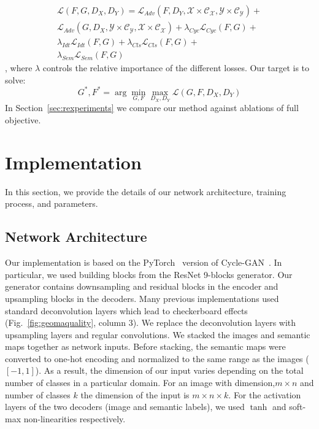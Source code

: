 \begin{equation}
\begin{aligned}
\mathcal{L}(F, G,D_X,D_Y) = \mathcal{L}_{Adv}(F, D_Y, \mathcal{ X \times C_X}, \mathcal{ Y \times C_Y}) + \\ \mathcal{L}_{Adv}(G, D_X, \mathcal{ Y \times C_Y}, \mathcal{ X \times C_X}) + \lambda_{Cyc}\mathcal{L}_{Cyc}(F, G) +\\ \lambda_{Idt}\mathcal{L}_{Idt}(F, G) + \lambda_{Cls}\mathcal{L}_{Cls}(F, G)+\\ \lambda_{Sem}\mathcal{L}_{Sem}(F, G)
\end{aligned}
\label{eq:fullobjective}
\end{equation}
, where $\lambda$ controls the relative importance of the different losses. Our target is to solve:
\begin{equation}
G^*, F^* = \arg \min_{G,F} \max_{D_X, D_Y}\mathcal{L}(G,F,D_X, D_Y)
\end{equation}
In Section~\ref{sec:rexperiments} we compare our method against ablations of full objective. 







\section{Implementation}\label{sec:implementation}
In this section, we provide the details of our network architecture, training process, and parameters.
\subsection{ Network Architecture}
Our implementation is based on the PyTorch~\cite{paszke_automatic_2017} version of Cycle-GAN~\cite{zhu_unpaired_2017}. In particular, we used building blocks from the  ResNet 9-blocks generator. Our generator contains downsampling and residual blocks in the encoder and upsampling blocks in the decoders. Many previous implementations used standard deconvolution layers which lead to checkerboard effects (Fig.~\ref{fig:geomaquality}, column 3). We replace the deconvolution layers with upsampling layers and regular convolutions. We stacked the images and semantic maps together as network inputs. Before stacking, the semantic maps were converted to one-hot encoding and normalized to the same range as the images ($[-1,1]$). As a result, the dimension of our input varies depending on the total number of classes in a particular domain. For an image with dimension,$m\times n$ and number of classes $k$ the dimension of the input is $m \times n \times k$. For the activation layers of the two decoders (image and semantic labels), we used $\tanh$ and soft-max non-linearities respectively. 

